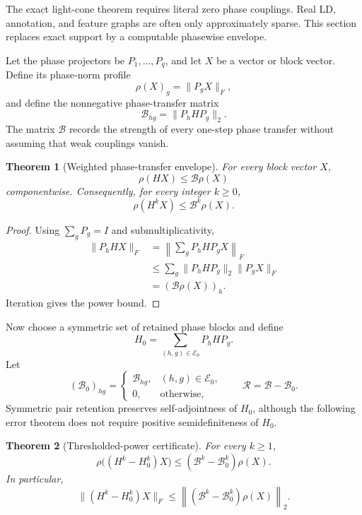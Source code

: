 \documentclass[11pt]{article}
\newtheorem{theorem}{Theorem}[section]
\theoremstyle{definition}
\theoremstyle{remark}
\begin{document}
The exact light-cone theorem requires literal zero phase couplings.  Real LD,
annotation, and feature graphs are often only approximately sparse.  This
section replaces exact support by a computable phasewise envelope.

Let the phase projectors be $P_1,\ldots,P_q$, and let $X$ be a vector or block
vector.  Define its phase-norm profile
\[
\rho(X)_g=\lVert P_gX\rVert_F,
\]
and define the nonnegative phase-transfer matrix
\[
\mathcal B_{hg}=\lVert P_hHP_g\rVert_2.
\]
The matrix $\mathcal B$ records the strength of every one-step phase transfer
without assuming that weak couplings vanish.

\begin{theorem}[Weighted phase-transfer envelope]
\label{thm:weighted-transfer}
For every block vector $X$,
\[
\boxed{
\rho(HX)\leq \mathcal B\rho(X)
}
\]
componentwise.  Consequently, for every integer $k\geq0$,
\[
\boxed{
\rho(H^kX)\leq \mathcal B^k\rho(X).
}
\]
\end{theorem}

\begin{proof}
Using $\sum_gP_g=I$ and submultiplicativity,
\[
\begin{aligned}
\lVert P_hHX\rVert_F
&=\left\lVert\sum_gP_hHP_gX\right\rVert_F\\
&\leq\sum_g\lVert P_hHP_g\rVert_2\lVert P_gX\rVert_F\\
&=(\mathcal B\rho(X))_h.
\end{aligned}
\]
Iteration gives the power bound.
\end{proof}

Now choose a symmetric set of retained phase blocks and define
\[
H_0=\sum_{(h,g)\in\mathcal E_0}P_hHP_g.
\]
Let
\[
(\mathcal B_0)_{hg}=
\begin{cases}
\mathcal B_{hg},&(h,g)\in\mathcal E_0,\\
0,&\text{otherwise},
\end{cases}
\qquad
\mathcal R=\mathcal B-\mathcal B_0.
\]
Symmetric pair retention preserves self-adjointness of $H_0$, although the
following error theorem does not require positive semidefiniteness of $H_0$.

\begin{theorem}[Thresholded-power certificate]
\label{thm:thresholded-power}
For every $k\geq1$,
\[
\boxed{
\rho\bigl((H^k-H_0^k)X\bigr)
\leq
(\mathcal B^k-\mathcal B_0^k)\rho(X).
}
\]
In particular,
\[
\boxed{
\lVert(H^k-H_0^k)X\rVert_F
\leq
\left\lVert(\mathcal B^k-\mathcal B_0^k)\rho(X)\right\rVert_2.
}
\]
\end{theorem}
\end{document}
